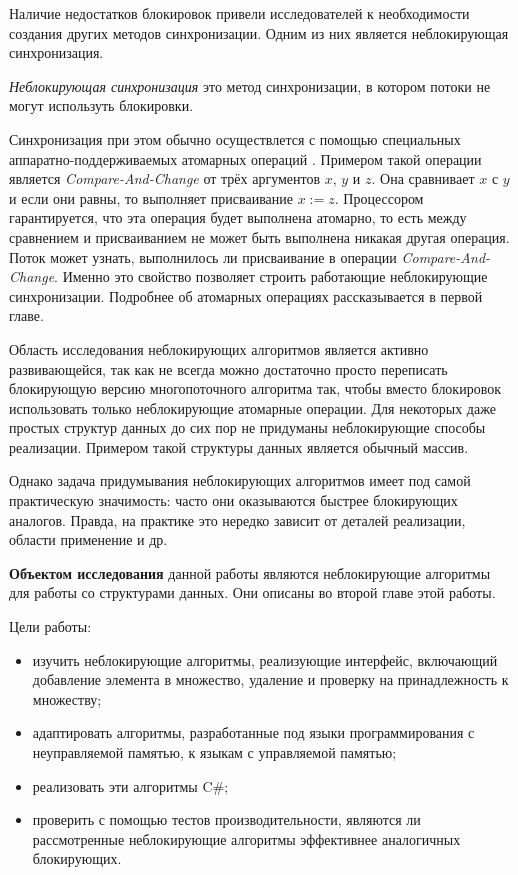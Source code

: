 \documentclass[12pt]{report}
\begin{document}
{		Наличие недостатков блокировок привели исследователей к необходимости создания других методов синхронизации. Одним из них является неблокирующая синхронизация. 
		
		\textit{Неблокирующая синхронизация} это метод синхронизации, в котором потоки не могут используть блокировки.
		
		Синхронизация при этом обычно осуществлется с помощью специальных аппаратно-поддерживаемых атомарных операций \cite{introLockFree}. Примером такой операции является \textit{Compare-And-Change} от трёх аргументов $x$, $y$ и $z$. Она сравнивает $x$ с $y$ и если они равны, то выполняет присваивание $x := z$. Процессором гарантируется, что эта операция будет выполнена атомарно, то есть между сравнением и присваиванием не может быть выполнена никакая другая операция. Поток может узнать, выполнилось ли присваивание в операции \textit{Compare-And-Change}. Именно это свойство позволяет строить работающие неблокирующие синхронизации. Подробнее об атомарных операциях рассказывается в первой главе.			
		
		Область исследования неблокирующих алгоритмов является активно развивающейся, так как не всегда можно достаточно просто переписать блокирующую версию многопоточного алгоритма так, чтобы вместо блокировок использовать только неблокирующие атомарные операции. Для некоторых даже простых структур данных до сих пор не придуманы неблокирующие способы реализации. Примером такой структуры данных является обычный массив.
		
		Однако задача придумывания неблокирующих алгоритмов имеет под самой практическую значимость: часто они оказываются быстрее блокирующих аналогов. Правда, на практике это нередко зависит от деталей реализации, области применение и др.
		
		\textbf{Объектом исследования} данной работы являются неблокирующие алгоритмы для работы со структурами данных. Они описаны во второй главе этой работы.
		
		Цели работы:
		\begin{itemize}
			\item изучить неблокирующие алгоритмы, реализующие интерфейс, включающий добавление элемента в множество, удаление и проверку на принадлежность к множеству;		\item адаптировать алгоритмы, разработанные под языки программирования с неуправляемой памятью, к языкам с управляемой памятью;
			\item реализовать эти алгоритмы C\#;
			\item проверить с помощью тестов производительности, являются ли рассмотренные неблокирующие алгоритмы эффективнее аналогичных блокирующих.
		\end{itemize}
		
}
\end{document}
